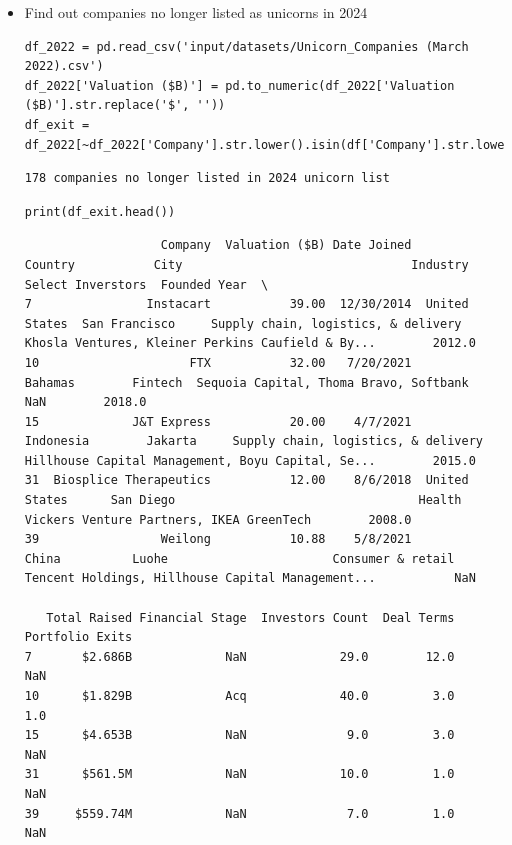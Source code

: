 \documentclass[a4paper,12pt]{article}
\begin{document}
\begin{itemize}
\item Find out companies no longer listed as unicorns in 2024

\begin{verbatim}
df_2022 = pd.read_csv('input/datasets/Unicorn_Companies (March 2022).csv')
df_2022['Valuation ($B)'] = pd.to_numeric(df_2022['Valuation ($B)'].str.replace('$', ''))
df_exit = df_2022[~df_2022['Company'].str.lower().isin(df['Company'].str.lower())]
\end{verbatim}

\label{}
\begin{verbatim}
178 companies no longer listed in 2024 unicorn list
\end{verbatim}


\begin{verbatim}
print(df_exit.head())
\end{verbatim}

\label{}
\begin{verbatim}
                   Company  Valuation ($B) Date Joined        Country           City                                Industry                                  Select Inverstors  Founded Year  \
7                Instacart           39.00  12/30/2014  United States  San Francisco     Supply chain, logistics, & delivery  Khosla Ventures, Kleiner Perkins Caufield & By...        2012.0
10                     FTX           32.00   7/20/2021        Bahamas        Fintech  Sequoia Capital, Thoma Bravo, Softbank                                                NaN        2018.0
15             J&T Express           20.00    4/7/2021      Indonesia        Jakarta     Supply chain, logistics, & delivery  Hillhouse Capital Management, Boyu Capital, Se...        2015.0
31  Biosplice Therapeutics           12.00    8/6/2018  United States      San Diego                                  Health           Vickers Venture Partners, IKEA GreenTech        2008.0
39                 Weilong           10.88    5/8/2021          China          Luohe                       Consumer & retail  Tencent Holdings, Hillhouse Capital Management...           NaN

   Total Raised Financial Stage  Investors Count  Deal Terms  Portfolio Exits
7       $2.686B             NaN             29.0        12.0              NaN
10      $1.829B             Acq             40.0         3.0              1.0
15      $4.653B             NaN              9.0         3.0              NaN
31      $561.5M             NaN             10.0         1.0              NaN
39     $559.74M             NaN              7.0         1.0              NaN
\end{verbatim}


\end{itemize}
\end{document}
